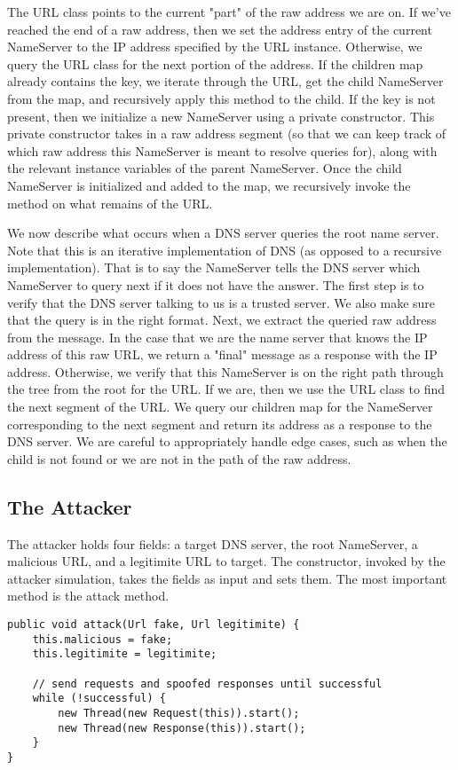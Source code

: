 \documentclass[a4paper, 12pt]{article} %
\begin{document}
The URL class points to the current "part" of the raw address we are on. If we've reached the end of a raw address, then we set the address entry of the current NameServer to the IP address specified by the URL instance. Otherwise, we query the URL class for the next portion of the address. If the children map already contains the key, we iterate through the URL, get the child NameServer from the map, and recursively apply this method to the child. If the key is not present, then we initialize a new NameServer using a private constructor. This private constructor takes in a raw address segment (so that we can keep track of which raw address this NameServer is meant to resolve queries for), along with the relevant instance variables of the parent NameServer. Once the child NameServer is initialized and added to the map, we recursively invoke the method on what remains of the URL.

We now describe what occurs when a DNS server queries the root name server. Note that this is an iterative implementation of DNS (as opposed to a recursive implementation). That is to say the NameServer tells the DNS server which NameServer to query next if it does not have the answer. The first step is to verify that the DNS server talking to us is a trusted server. We also make sure that the query is in the right format. Next, we extract the queried raw address from the message. In the case that we are the name server that knows the IP address of this raw URL, we return a "final" message as a response with the IP address. Otherwise, we verify that this NameServer is on the right path through the tree from the root for the URL. If we are, then we use the URL class to find the next segment of the URL. We query our children map for the NameServer corresponding to the next segment and return its address as a response to the DNS server. We are careful to appropriately handle edge cases, such as when the child is not found or we are not in the path of the raw address.

\subsection*{The Attacker}

The attacker holds four fields: a target DNS server, the root NameServer, a malicious URL, and a legitimite URL to target. The constructor, invoked by the attacker simulation, takes the fields as input and sets them. The most important method is the attack method.

\begin{lstlisting}
public void attack(Url fake, Url legitimite) {
    this.malicious = fake;
    this.legitimite = legitimite;
    
    // send requests and spoofed responses until successful
    while (!successful) {
        new Thread(new Request(this)).start();
        new Thread(new Response(this)).start();
    }
}
\end{lstlisting}
\end{document}
